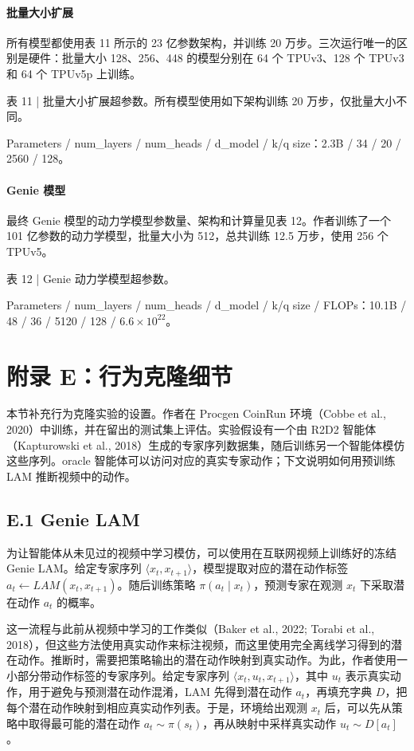 \documentclass[10pt]{article}
\begin{document}
\paragraph{批量大小扩展}
所有模型都使用表 11 所示的 23 亿参数架构，并训练 20 万步。三次运行唯一的区别是硬件：批量大小 128、256、448 的模型分别在 64 个 TPUv3、128 个 TPUv3 和 64 个 TPUv5p 上训练。

表 11 | 批量大小扩展超参数。所有模型使用如下架构训练 20 万步，仅批量大小不同。

Parameters / num\_layers / num\_heads / d\_model / k/q size：2.3B / 34 / 20 / 2560 / 128。

\paragraph{Genie 模型}
最终 Genie 模型的动力学模型参数量、架构和计算量见表 12。作者训练了一个 101 亿参数的动力学模型，批量大小为 512，总共训练 12.5 万步，使用 256 个 TPUv5。

表 12 | Genie 动力学模型超参数。

Parameters / num\_layers / num\_heads / d\_model / k/q size / FLOPs：10.1B / 48 / 36 / 5120 / 128 / $6.6 \times 10^{22}$。

\section*{附录 E：行为克隆细节}

本节补充行为克隆实验的设置。作者在 Procgen CoinRun 环境（Cobbe et al., 2020）中训练，并在留出的测试集上评估。实验假设有一个由 R2D2 智能体（Kapturowski et al., 2018）生成的专家序列数据集，随后训练另一个智能体模仿这些序列。oracle 智能体可以访问对应的真实专家动作；下文说明如何用预训练 LAM 推断视频中的动作。

\subsection*{E.1 Genie LAM}

为让智能体从未见过的视频中学习模仿，可以使用在互联网视频上训练好的冻结 Genie LAM。给定专家序列 $\langle x_t, x_{t+1} \rangle$，模型提取对应的潜在动作标签 $a_t \leftarrow LAM(x_t, x_{t+1})$。随后训练策略 $\pi(a_t \mid x_t)$，预测专家在观测 $x_t$ 下采取潜在动作 $a_t$ 的概率。

这一流程与此前从视频中学习的工作类似（Baker et al., 2022; Torabi et al., 2018），但这些方法使用真实动作来标注视频，而这里使用完全离线学习得到的潜在动作。推断时，需要把策略输出的潜在动作映射到真实动作。为此，作者使用一小部分带动作标签的专家序列。给定专家序列 $\langle x_t, u_t, x_{t+1} \rangle$，其中 $u_t$ 表示真实动作，用于避免与预测潜在动作混淆，LAM 先得到潜在动作 $a_t$，再填充字典 $D$，把每个潜在动作映射到相应真实动作列表。于是，环境给出观测 $x_t$ 后，可以先从策略中取得最可能的潜在动作 $a_t \sim \pi(s_t)$，再从映射中采样真实动作 $u_t \sim D[a_t]$。
\end{document}

